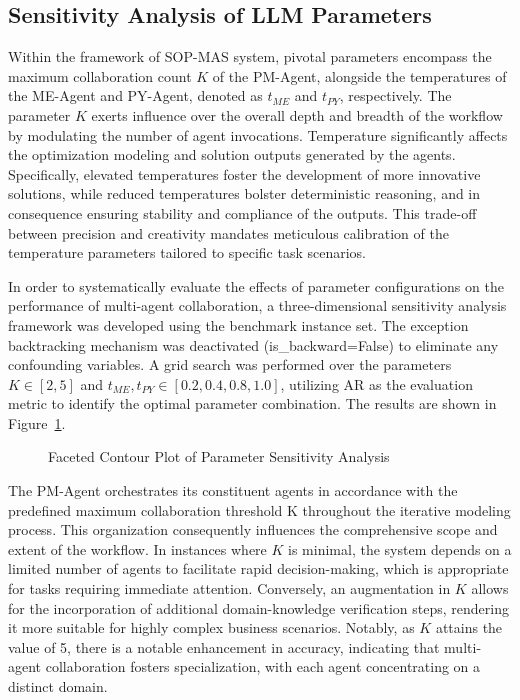 \documentclass[preprint,12pt]{elsarticle}
\begin{document}
\subsection{Sensitivity Analysis of LLM Parameters}

Within the framework of SOP-MAS system, pivotal parameters encompass the maximum collaboration count $K$ of the PM-Agent, alongside the temperatures of the ME-Agent and PY-Agent, denoted as $t_{ME}$ and $t_{PY}$, respectively. The parameter $K$ exerts influence over the overall depth and breadth of the workflow by modulating the number of agent invocations. Temperature significantly affects the optimization modeling and solution outputs generated by the agents. Specifically, elevated temperatures foster the development of more innovative solutions, while reduced temperatures bolster deterministic reasoning, and in consequence ensuring stability and compliance of the outputs. This trade-off between precision and creativity mandates meticulous calibration of the temperature parameters tailored to specific task scenarios.

In order to systematically evaluate the effects of parameter configurations on the performance of multi-agent collaboration, a three-dimensional sensitivity analysis framework was developed using the benchmark instance set. The exception backtracking mechanism was deactivated (is\_backward=False) to eliminate any confounding variables. A grid search was performed over the parameters $K\in[2,5]$ and $t_{ME},t_{PY}\in [0.2,0.4,0.8,1.0]$, utilizing AR as the evaluation metric to identify the optimal parameter combination. The results are shown in Figure~\ref{fig3}.

\begin{figure}[t]%
\centering%
\caption{Faceted Contour Plot of Parameter Sensitivity Analysis}\label{fig3}
\end{figure}

The PM-Agent orchestrates its constituent agents in accordance with the predefined maximum collaboration threshold K throughout the iterative modeling process. This organization consequently influences the comprehensive scope and extent  of the workflow. In instances where $K$ is minimal, the system depends on a limited number of agents to facilitate rapid decision-making, which is appropriate for tasks requiring immediate attention. Conversely, an augmentation in $K$ allows for the incorporation of additional domain-knowledge verification steps, rendering  it more suitable for highly complex business scenarios. Notably, as $K$ attains the value of 5, there is a notable enhancement in accuracy, indicating that multi-agent collaboration fosters specialization, with each agent concentrating on a distinct domain.
\end{document}
